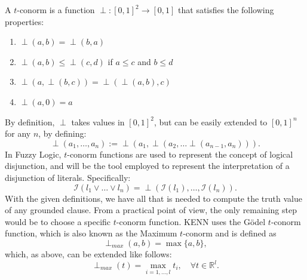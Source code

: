 \begin{definition}[$t$-conorm ]
	\label{def:t-conorm}
	A $t$-conorm is a function $\perp: \left[0,1 \right]^2 \rightarrow \left[0,1 \right]$ that satisfies the following properties:
	\begin{enumerate}
		\item $\perp(a, b)=\perp(b, a)$
		\item $\perp(a, b) \leq \perp(c, d)$ if $a \leq c$ and $b \leq d$
		\item $\perp(a, \perp(b, c))=\perp(\perp(a, b), c)$
		\item $\perp(a, 0)=a$
	\end{enumerate}
\end{definition}
By definition, $\perp$ takes values in $\left[0,1 \right]^2$, but can be easily extended to $\left[0,1 \right]^n$ for any $n$, by defining:
\begin{equation*}
\perp(a_1,\dots,a_n) := \perp(a_1,\perp(a_2,\dots \perp(a_{n-1},a_n))).
\end{equation*}
In Fuzzy Logic, $t$-conorm functions are used to represent the concept of logical disjunction, and will be the tool employed to represent the interpretation of a disjunction of literals. Specifically:
\begin{equation}
\mathcal{I}(l_1 \vee \dots \vee l_n) = \perp(\mathcal{I}(l_1),\dots,\mathcal{I}(l_n)).
\end{equation}
With the given definitions, we have all that is needed to compute the truth value of any grounded clause. From a practical point of view, the only remaining step would be to choose a specific $t$-conorm function. KENN uses the Gödel $t$-conorm function, which is also known as the Maximum $t$-conorm and is defined as
\begin{equation*}
\perp_{max}(a,b) = \max\{a,b\},
\end{equation*}
which, as above, can be extended like follows:
\begin{equation*}
\perp_{max}(t) = \max_{i=1,\dots,l} t_i, \quad \forall t \in \mathbb{R}^l.
\end{equation*}

